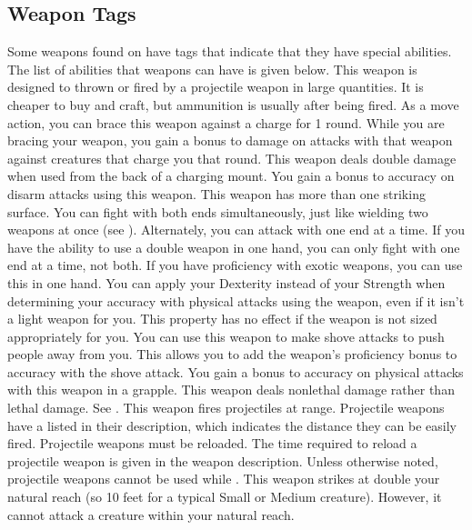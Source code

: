    \subsection{Weapon Tags}
        Some weapons found on  have tags that indicate that they have special abilities. The list of abilities that weapons can have is given below.
         This weapon is designed to thrown or fired by a projectile weapon in large quantities. It is cheaper to buy and craft, but ammunition is usually  after being fired.
         As a move action, you can brace this weapon against a charge for 1 round. While you are bracing your weapon, you gain a  bonus to damage on attacks with that weapon against creatures that charge you that round.
         This weapon deals double damage when used from the back of a charging mount.
         You gain a  bonus to accuracy on disarm attacks using this weapon.
         This weapon has more than one striking surface. You can fight with both ends simultaneously, just like wielding two weapons at once (see ). Alternately, you can attack with one end at a time. If you have the ability to use a double weapon in one hand, you can only fight with one end at a time, not both.
         If you have proficiency with exotic weapons, you can use this in one hand.
         You can apply your Dexterity instead of your Strength when determining your accuracy with physical attacks using the weapon, even if it isn't a light weapon for you.
        This property has no effect if the weapon is not sized appropriately for you.
         You can use this weapon to make shove attacks to push people away from you. This allows you to add the weapon's proficiency bonus to accuracy with the shove attack.
         You gain a  bonus to accuracy on physical attacks with this weapon in a grapple.
         This weapon deals nonlethal damage rather than lethal damage. See .
         This weapon fires projectiles at range. Projectile weapons have a  listed in their description, which indicates the distance they can be easily fired. Projectile weapons must be reloaded. The time required to reload a projectile weapon is given in the weapon description.
        Unless otherwise noted, projectile weapons cannot be used while \prone.
        \label{Reach Weapon} This weapon strikes at double your natural reach (so 10 feet for a typical Small or Medium creature). However, it cannot attack a creature within your natural reach.

